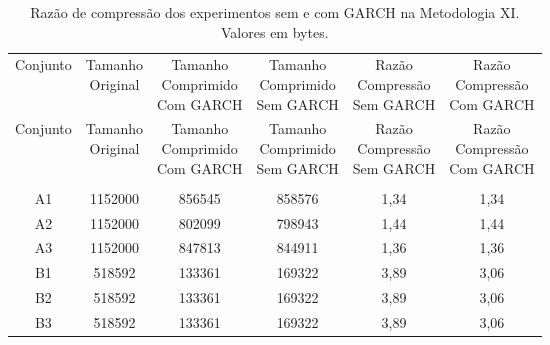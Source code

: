 \begin{center}
\begin{longtable}{cccccc}
\toprule
\rowcolor{white}
\caption[Metodologia XI: Razão de compressão]{Razão de compressão dos
experimentos sem e com GARCH na Metodologia XI.
Valores em bytes.} \label{Tab:razaocompressaoMet} \\
\midrule
Conjunto & \specialcell{Tamanho \\Original} & \specialcell{Tamanho
\\Comprimido\\Com GARCH} & \specialcell{Tamanho
\\Comprimido\\Sem GARCH} & \specialcell{Razão \\Compressão
\\Sem GARCH} & \specialcell{Razão \\Compressão
\\Com GARCH} \\
\midrule
\endfirsthead
\midrule
\rowcolor{white}
Conjunto & \specialcell{Tamanho \\Original} & \specialcell{Tamanho
\\Comprimido\\Com GARCH} & \specialcell{Tamanho
\\Comprimido\\Sem GARCH} & \specialcell{Razão \\Compressão
\\Sem GARCH} & \specialcell{Razão \\Compressão
\\Com GARCH} \\
\toprule
\endhead
\midrule \\ %
\endfoot
\bottomrule
\endlastfoot
    A1    & 1152000 & 856545 & 858576 & 1,34  & 1,34 \\
    A2    & 1152000 & 802099 & 798943 & 1,44  & 1,44 \\
    A3    & 1152000 & 847813 & 844911 & 1,36  & 1,36 \\
    B1    & 518592 & 133361 & 169322 & 3,89  & 3,06 \\
    B2    & 518592 & 133361 & 169322 & 3,89  & 3,06 \\
    B3    & 518592 & 133361 & 169322 & 3,89  & 3,06 \\

\end{longtable}
\end{center}
